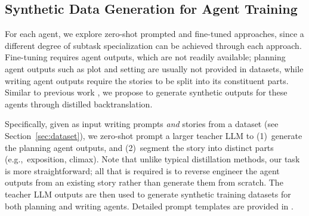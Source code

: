 \documentclass{article}
\newcommand{\reinald}[1]{{\textcolor{teal}{\bf{Reinald:} \emph{#1}}}}
\begin{document}
\subsection{Synthetic Data Generation for Agent Training}
\label{sec:agent_training}



For each  agent, we explore zero-shot prompted and fine-tuned approaches, 
since a different degree of subtask specialization can be achieved through each approach. 
Fine-tuning requires agent outputs, which are not readily available; planning agent outputs such as plot and setting are usually not provided in datasets, while writing agent outputs require the stories to be split into its constituent parts. Similar to previous work \citep{schick2022peer,narayan2023conditional,josifoski-etal-2023-exploiting}, we propose to generate synthetic outputs for these agents through distilled backtranslation.

Specifically, given as input writing prompts \emph{and} stories from a dataset (see Section~\ref{sec:dataset}), we zero-shot prompt a larger teacher LLM to (1)~generate the planning agent outputs, and (2)~segment the story into distinct parts (e.g.,~exposition, climax).
Note that unlike typical distillation methods, our task is more straightforward; all that is required is to reverse engineer the agent outputs from an existing story rather than generate them from scratch. 
The teacher LLM outputs are then used to generate synthetic training datasets for both planning and writing agents. 
Detailed prompt templates are provided in
. 







\end{document}
